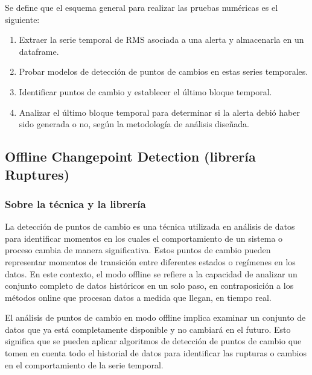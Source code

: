 \documentclass{article}[14pts]
\begin{document}
    Se define que el esquema general para realizar las pruebas numéricas es el siguiente:

      \begin{enumerate}

        \item Extraer la serie temporal de RMS asociada a una alerta y almacenarla en un dataframe. 
          
        \item Probar modelos de detección de puntos de cambios en estas series temporales.
          
        \item Identificar puntos de cambio y establecer el último bloque temporal. 
          
        \item Analizar el último bloque temporal para determinar si la alerta debió haber sido generada o no, según la metodología de análisis diseñada.
          
      \end{enumerate}
    
  \subsection{Offline Changepoint Detection (librería Ruptures)}

  \subsubsection{Sobre la técnica y la librería}

    La detección de puntos de cambio es una técnica utilizada en análisis de datos para identificar momentos en los cuales el comportamiento de un sistema o proceso cambia de manera significativa. Estos puntos de cambio pueden representar momentos de transición entre diferentes estados o regímenes en los datos. En este contexto, el modo offline se refiere a la capacidad de analizar un conjunto completo de datos históricos en un solo paso, en contraposición a los métodos online que procesan datos a medida que llegan, en tiempo real.

    El análisis de puntos de cambio en modo offline implica examinar un conjunto de datos que ya está completamente disponible y no cambiará en el futuro. Esto significa que se pueden aplicar algoritmos de detección de puntos de cambio que tomen en cuenta todo el historial de datos para identificar las rupturas o cambios en el comportamiento de la serie temporal.
    
\end{document}

